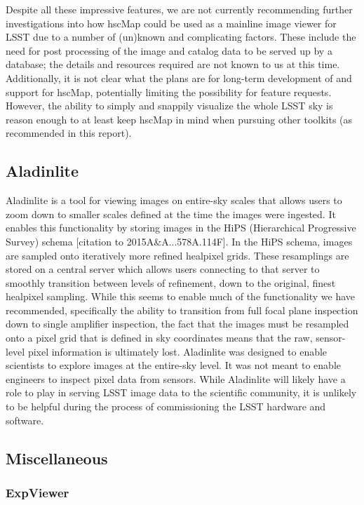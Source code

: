 Despite all these impressive features, we are not currently recommending further investigations into how hscMap could be used as a mainline image viewer for LSST due to a number of (un)known and complicating factors.
These include the need for post processing of the image and catalog data to be served up by a database; the details and resources required are not known to us at this time.
Additionally, it is not clear what the plans are for long-term development of and support for hscMap, potentially limiting the possibility for feature requests.
However, the ability to simply and snappily visualize the whole LSST sky is reason enough to at least keep hscMap in mind when pursuing other toolkits (as recommended in this report).


\subsection{Aladinlite}

Aladinlite is a tool for viewing images on entire-sky scales that allows users
to zoom down to smaller scales defined at the time the images were ingested.
It enables this functionality by storing images in the HiPS (Hierarchical
Progressive Survey) schema [citation to 2015A\&A...578A.114F].  In the HiPS
schema, images are sampled onto iteratively more refined healpixel grids.  These
resamplings are stored on a central server which allows users connecting to that
server to smoothly transition between levels of refinement, down to the
original, finest healpixel sampling.  While this seems to enable much of the
functionality we have recommended, specifically the ability to transition from
full focal plane inspection down to single amplifier inspection, the fact that
the images must be resampled onto a pixel grid that is defined in sky
coordinates means that the raw, sensor-level pixel information is ultimately
lost.  Aladinlite was designed to enable scientists to explore images at the
entire-sky level.  It was not meant to enable engineers to inspect pixel data
from sensors.  While Aladinlite will likely have a role to play in serving LSST
image data to the scientific community, it is unlikely to be helpful during the
process of commissioning the LSST hardware and software.

\subsection{Miscellaneous}
\subsubsection{ExpViewer}
\label{sec:existing_tools:misc:expviewer}

